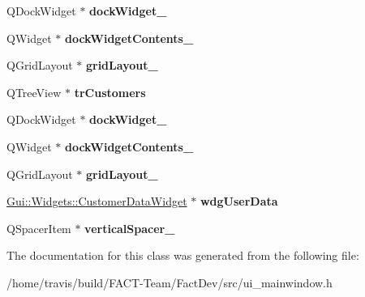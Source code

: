 \begin{DoxyCompactItemize}
\item 
\hypertarget{classUi__MainWindow_a915b5b97f656d132b6fcc0b93ee088c2}{Q\-Dock\-Widget $\ast$ {\bfseries dock\-Widget\-\_}}\label{classUi__MainWindow_a915b5b97f656d132b6fcc0b93ee088c2}

\item 
\hypertarget{classUi__MainWindow_af54c2ad50aa3702180e8ca2026d34088}{Q\-Widget $\ast$ {\bfseries dock\-Widget\-Contents\-\_}}\label{classUi__MainWindow_af54c2ad50aa3702180e8ca2026d34088}

\item 
\hypertarget{classUi__MainWindow_a8ee86315639f324b17708efc7dbe8b19}{Q\-Grid\-Layout $\ast$ {\bfseries grid\-Layout\-\_}}\label{classUi__MainWindow_a8ee86315639f324b17708efc7dbe8b19}

\item 
\hypertarget{classUi__MainWindow_a7a1663220950d59adfb3f8de434bac51}{Q\-Tree\-View $\ast$ {\bfseries tr\-Customers}}\label{classUi__MainWindow_a7a1663220950d59adfb3f8de434bac51}

\item 
\hypertarget{classUi__MainWindow_ad4380a846cc54ade0025eafc00085230}{Q\-Dock\-Widget $\ast$ {\bfseries dock\-Widget\-\_}}\label{classUi__MainWindow_ad4380a846cc54ade0025eafc00085230}

\item 
\hypertarget{classUi__MainWindow_a9a843dd5296065a2d320fa8f083e4b59}{Q\-Widget $\ast$ {\bfseries dock\-Widget\-Contents\-\_}}\label{classUi__MainWindow_a9a843dd5296065a2d320fa8f083e4b59}

\item 
\hypertarget{classUi__MainWindow_a4c2d544352d423a361b8ab2e1d5636ec}{Q\-Grid\-Layout $\ast$ {\bfseries grid\-Layout\-\_}}\label{classUi__MainWindow_a4c2d544352d423a361b8ab2e1d5636ec}

\item 
\hypertarget{classUi__MainWindow_a80167b482266a8f566f3ce6f79937e37}{\hyperlink{classGui_1_1Widgets_1_1CustomerDataWidget}{Gui\-::\-Widgets\-::\-Customer\-Data\-Widget} $\ast$ {\bfseries wdg\-User\-Data}}\label{classUi__MainWindow_a80167b482266a8f566f3ce6f79937e37}

\item 
\hypertarget{classUi__MainWindow_adc1f5fdd97fb3729999c56902d0fa591}{Q\-Spacer\-Item $\ast$ {\bfseries vertical\-Spacer\-\_}}\label{classUi__MainWindow_adc1f5fdd97fb3729999c56902d0fa591}

\end{DoxyCompactItemize}


The documentation for this class was generated from the following file\-:\begin{DoxyCompactItemize}
\item 
/home/travis/build/\-F\-A\-C\-T-\/\-Team/\-Fact\-Dev/src/ui\-\_\-mainwindow.\-h\end{DoxyCompactItemize}

